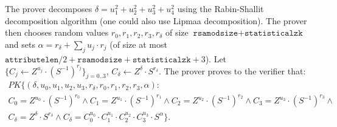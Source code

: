 The prover decomposes $\delta=u_1^2+u_2^2+u_3^2+u_4^2$ using the Rabin-Shallit decomposition algorithm
(one could also use Lipmaa decomposition). The prover then chooses random values
$r_0, r_1, r_2, r_3, r_\delta$ of size $\texttt{rsamodsize}+\texttt{statisticalzk}$ and sets
$\alpha = r_\delta + \sum_j u_j\cdot r_j$ (of size at most $\texttt{attributelen}/2+\texttt{rsamodsize}+\texttt{statisticalzk}+3$).
Let $\lbrace C_j \gets Z^{u_j}\cdot (S^{-1})^{r_j} \rbrace_{j=0..3}$, $C_\delta \gets Z^\delta \cdot S^{r_\delta}$.
The prover proves to the verifier that:
\begin{align*}
\textit{PK}\lbrace (\delta, u_0, u_1, u_2, u_3, r_\delta, r_0, r_1, r_2, r_3, \alpha):\\
C_0 = Z^{u_0}\cdot (S^{-1})^{r_0} \wedge
C_1 = Z^{u_1}\cdot (S^{-1})^{r_1} \wedge
C_2 = Z^{u_2}\cdot (S^{-1})^{r_2} \wedge
C_3 = Z^{u_3}\cdot (S^{-1})^{r_3} \wedge\\
C_\delta = Z^{\delta}\cdot S^{r_\delta} \wedge
C_\delta = C_0^{u_0} \cdot C_1^{u_1} \cdot C_2^{u_2} \cdot C_3^{u_3} \cdot S^\alpha
\rbrace.
\end{align*}


